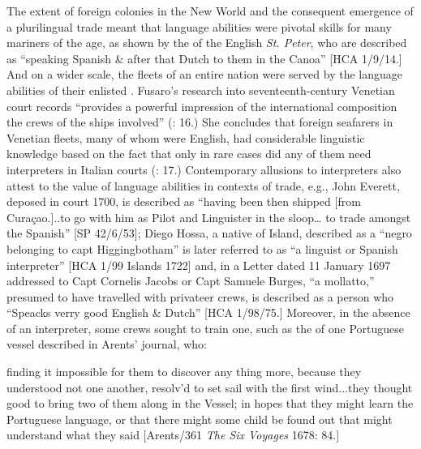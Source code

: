 The extent of foreign colonies in the New World and the consequent emergence of a plurilingual  trade meant that language abilities were pivotal skills for many mariners of the age, as shown by the  of the English \textit{St. Peter}, who are described as “speaking Spanish \& after that Dutch to them in the Canoa” [HCA 1/9/14.] And on a wider scale, the  fleets of an entire nation were served by the language abilities of their enlisted . Fusaro’s research into seventeenth-century Venetian court records “provides a powerful impression of the international composition the crews of the ships involved” (\citeyear*{Fusaro2015}: 16.) She concludes that foreign seafarers in Venetian fleets, many of whom were English, had considerable linguistic knowledge based on the fact that only in rare cases did any of them need interpreters in Italian courts (\citealt{Fusaro2015}: 17.) Contemporary allusions to interpreters also attest to the value of language abilities in contexts of trade, e.g., John Everett, deposed in court 1700, is described as “having been then shipped [from Curaçao.]..to go with him as Pilot and Linguister in the sloop… to trade amongst the Spanish” [SP 42/6/53]; Diego Hossa, a native of  Island, described as a “negro belonging to capt Higgingbotham” is later referred to as “a linguist or Spanish interpreter” [HCA 1/99  Islands 1722] and, in a Letter dated 11 January {1697} addressed to Capt Cornelis Jacobs or Capt Samuele Burges, “a mollatto,” presumed to have travelled with privateer crews, is described as a person who “Speacks verry good English \& Dutch” [HCA 1/98/75.] Moreover, in the absence of an interpreter, some crews sought to train one, such as the  of one Portuguese vessel described in Arents’ journal, who:

finding it impossible for them to discover any thing more, because they understood not one another, resolv’d to set sail with the first wind...they thought good to bring two of them along in the Vessel; in hopes that they might learn the Portuguese language, or that there might some child be found out that might understand what they said [Arents/361 \textit{The Six Voyages} 1678: 84.] 

